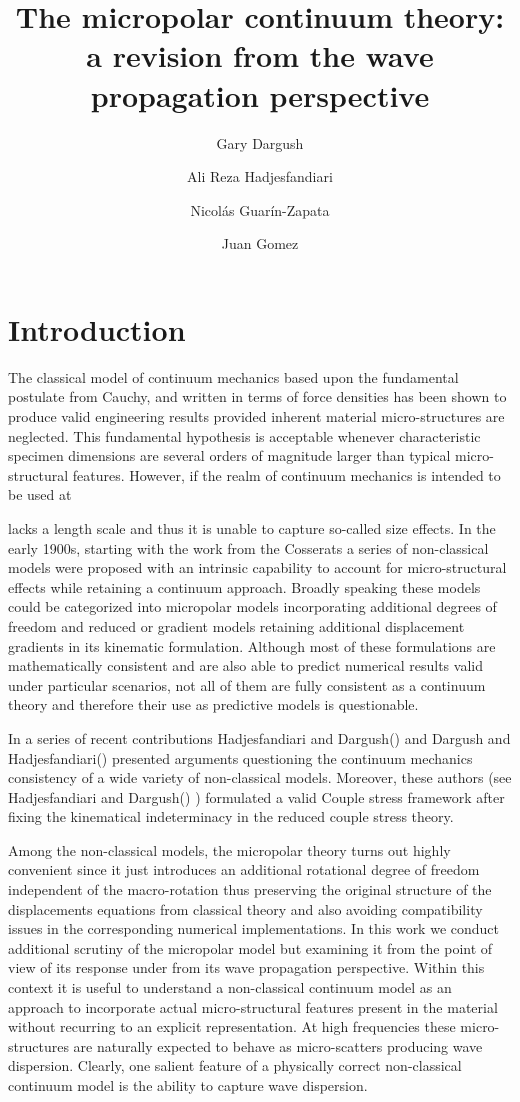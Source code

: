 \documentclass[12pt]{article}
\title{\textbf{The micropolar continuum theory: a revision from the wave propagation perspective}}
\author{Gary Dargush \and Ali Reza Hadjesfandiari \and Nicolás Guarín-Zapata \and Juan Gomez}
\begin{document}
\maketitle

\section{Introduction}
The classical model of continuum mechanics based upon the fundamental postulate from Cauchy, and written in terms of force densities has been shown to produce valid engineering results provided inherent material micro-structures are neglected. This fundamental hypothesis is acceptable whenever characteristic specimen dimensions are several orders of magnitude larger than typical micro-structural features. However, if the realm of continuum mechanics is intended to be used at 

 lacks a length scale and thus it is unable to capture so-called size effects. In the early 1900s, starting with the work from the Cosserats \citep{Cosserat1909} a series of non-classical models were proposed with an intrinsic capability to account for micro-structural effects while retaining a continuum approach. Broadly speaking these models could be categorized into micropolar models incorporating additional degrees of freedom and reduced or gradient models retaining additional displacement gradients in its kinematic formulation. Although most of these formulations are mathematically consistent and are also able to predict numerical results valid under particular scenarios, not all of them are fully consistent as a continuum theory and therefore their use as predictive models is questionable.

In a series of recent contributions Hadjesfandiari and Dargush() and Dargush and Hadjesfandiari() presented arguments questioning the continuum mechanics consistency of a wide variety of non-classical models. Moreover, these authors (see Hadjesfandiari and Dargush() ) formulated a valid Couple stress framework after fixing the kinematical indeterminacy in the reduced couple stress theory.

Among the non-classical models, the micropolar theory \citep{Eringen1966} turns out highly convenient since it just introduces an additional rotational degree of freedom independent of the macro-rotation thus preserving the original structure of the displacements equations from classical theory and also avoiding compatibility issues in the corresponding numerical implementations. In this work we conduct additional scrutiny of the micropolar model but examining it from the point of view of its response under from its wave propagation perspective. Within this context it is useful to understand a non-classical continuum model as an approach to incorporate actual micro-structural features present in the material without recurring to an explicit representation. At high frequencies these micro-structures are naturally expected to behave as micro-scatters producing wave dispersion. Clearly, one salient feature of a physically correct non-classical continuum model is the ability to capture wave dispersion.
\end{document}
